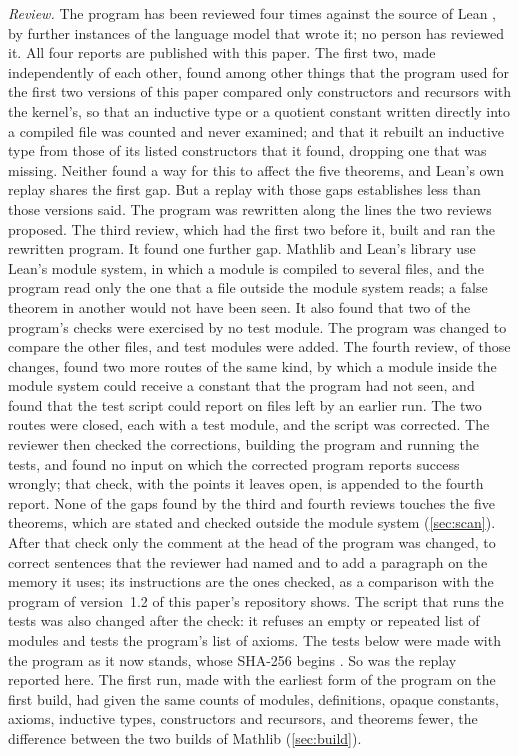\emph{Review.} The program has been reviewed four times against the source of Lean
\leanversion{}, by further instances of the language model that wrote it; no person has
reviewed it. All four reports are published with this paper. The first two, made
independently of each other, found among other things that the program used for the first
two versions of this
paper compared only constructors and recursors with the kernel's, so that an inductive type or
a quotient constant written directly into a compiled file was counted and never examined; and
that it rebuilt an inductive type from those of its listed constructors that it found,
dropping one that was missing. Neither found a way for this to affect the five theorems, and
Lean's own replay shares the first gap. But a replay with those gaps establishes less than
those versions said. The program was rewritten along the lines the two reviews proposed. The
third review, which had the first two before it, built and ran the rewritten program. It
found one further gap. Mathlib and Lean's library use Lean's module system, in which a module
is compiled to several files, and the program read only the one that a file outside the
module system reads; a false theorem in another would not have been seen. It
also found that two of the program's checks were exercised by no test module. The program
was changed to compare the other files, and test modules were added. The fourth review, of
those changes, found two more routes of the same kind, by which a module inside the module
system could receive a constant that the program had not seen, and found that the test script
could report on files left by an earlier run. The two routes were closed, each with a test
module, and the script was corrected. The reviewer then checked the corrections, building
the program and running the tests, and found no input on which the corrected program reports
success wrongly; that check, with the points it leaves open, is appended to the fourth
report. None of the gaps found by the third
and fourth reviews touches the five theorems, which are stated and checked outside the module
system (\cref{sec:scan}). After that check only the comment at the head of the program was
changed, to correct sentences that the reviewer had named and to add a paragraph on the
memory it uses; its instructions are the ones checked, as a comparison with the program of
version~1.2 of this paper's repository shows. The script that runs the tests was also
changed after the check: it refuses an empty or repeated list of modules and tests the
program's list of axioms. The tests below were made with the program as it now stands,
whose SHA-256 begins {\small\ttfamily \hostileprogramsha}.
\ifsecondrun
So was the replay reported here. The first run, made with the earliest form of the program on
the first build, had given the same counts of modules, definitions, opaque constants, axioms,
inductive types, constructors and recursors, and \mathlibextra{} theorems fewer, the
difference between the two builds of Mathlib (\cref{sec:build}).
\fi

